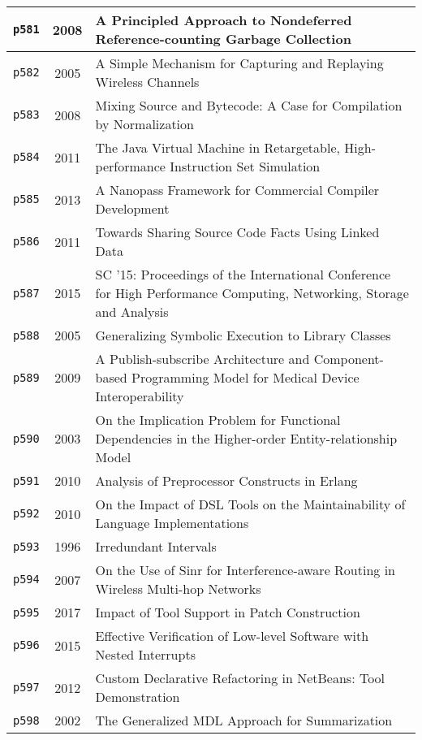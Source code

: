 \begin{longtable}{| c | c | p{16cm} |}
  \hline
  \texttt{p581} & 2008 & A Principled Approach to Nondeferred Reference-counting Garbage Collection \\
  \hline
  \texttt{p582} & 2005 & A Simple Mechanism for Capturing and Replaying Wireless Channels \\
  \hline
  \texttt{p583} & 2008 & Mixing Source and Bytecode: A Case for Compilation by Normalization \\
  \hline
  \texttt{p584} & 2011 & The Java Virtual Machine in Retargetable, High-performance Instruction Set Simulation \\
  \hline
  \texttt{p585} & 2013 & A Nanopass Framework for Commercial Compiler Development \\
  \hline
  \texttt{p586} & 2011 & Towards Sharing Source Code Facts Using Linked Data \\
  \hline
  \texttt{p587} & 2015 & SC '15: Proceedings of the International Conference for High Performance Computing, Networking, Storage and Analysis \\
  \hline
  \texttt{p588} & 2005 & Generalizing Symbolic Execution to Library Classes \\
  \hline
  \texttt{p589} & 2009 & A Publish-subscribe Architecture and Component-based Programming Model for Medical Device Interoperability \\
  \hline
  \texttt{p590} & 2003 & On the Implication Problem for Functional Dependencies in the Higher-order Entity-relationship Model \\
  \hline
  \texttt{p591} & 2010 & Analysis of Preprocessor Constructs in Erlang \\
  \hline
  \texttt{p592} & 2010 & On the Impact of DSL Tools on the Maintainability of Language Implementations \\
  \hline
  \texttt{p593} & 1996 & Irredundant Intervals \\
  \hline
  \texttt{p594} & 2007 & On the Use of Sinr for Interference-aware Routing in Wireless Multi-hop Networks \\
  \hline
  \texttt{p595} & 2017 & Impact of Tool Support in Patch Construction \\
  \hline
  \texttt{p596} & 2015 & Effective Verification of Low-level Software with Nested Interrupts \\
  \hline
  \texttt{p597} & 2012 & Custom Declarative Refactoring in NetBeans: Tool Demonstration \\
  \hline
  \texttt{p598} & 2002 & The Generalized MDL Approach for Summarization \\

\end{longtable}
